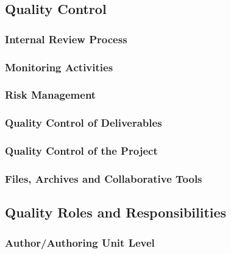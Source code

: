 \documentclass[
  11pt,
]{article}
\begin{document}
\hypertarget{quality-control-1}{%
\subsection{Quality Control}\label{quality-control-1}}

\hypertarget{internal-review-process}{%
\subsubsection{Internal Review Process}\label{internal-review-process}}

\hypertarget{monitoring-activities}{%
\subsubsection{Monitoring Activities}\label{monitoring-activities}}

\hypertarget{risk-management}{%
\subsubsection{Risk Management}\label{risk-management}}

\hypertarget{quality-control-of-deliverables}{%
\subsubsection{Quality Control of
Deliverables}\label{quality-control-of-deliverables}}

\hypertarget{quality-control-of-the-project}{%
\subsubsection{Quality Control of the
Project}\label{quality-control-of-the-project}}

\hypertarget{files-archives-and-collaborative-tools}{%
\subsubsection{Files, Archives and Collaborative
Tools}\label{files-archives-and-collaborative-tools}}

\hypertarget{quality-roles-and-responsibilities}{%
\subsection{Quality Roles and
Responsibilities}\label{quality-roles-and-responsibilities}}

\hypertarget{authorauthoring-unit-level}{%
\subsubsection{Author/Authoring Unit
Level}\label{authorauthoring-unit-level}}
\end{document}
